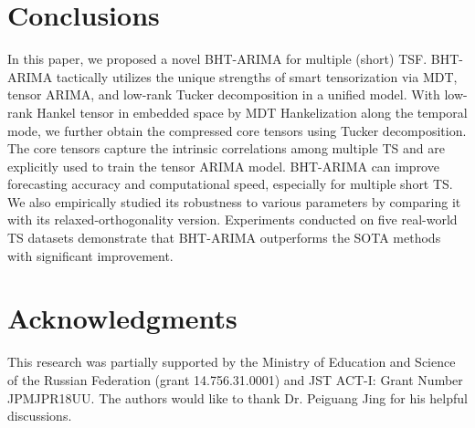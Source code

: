 \documentclass[letterpaper]{article} %
\numberwithin{theorem}{section}
\begin{document}
\section{Conclusions}



In this paper, we  proposed a novel  BHT-ARIMA for multiple (short) TSF. BHT-ARIMA tactically utilizes the unique strengths of  smart tensorization via MDT, tensor ARIMA, and low-rank Tucker
decomposition in a unified model.  With low-rank Hankel tensor in embedded space by MDT Hankelization along  the temporal mode, we further obtain the compressed core tensors using Tucker decomposition. The core tensors   capture the intrinsic correlations among multiple TS and  are explicitly used to train the  tensor ARIMA model.  BHT-ARIMA   can improve  forecasting accuracy and computational speed, especially for multiple short TS.  We also empirically studied its robustness  to various parameters by comparing it with its relaxed-orthogonality version.  Experiments conducted on five real-world TS datasets demonstrate that  BHT-ARIMA outperforms  the SOTA methods with significant improvement.

\section*{Acknowledgments}
This  research was partially supported by the Ministry of Education and Science of the Russian Federation (grant 14.756.31.0001) and JST ACT-I: Grant Number JPMJPR18UU. The authors  would like to thank Dr. Peiguang Jing for his helpful discussions.
\end{document}
